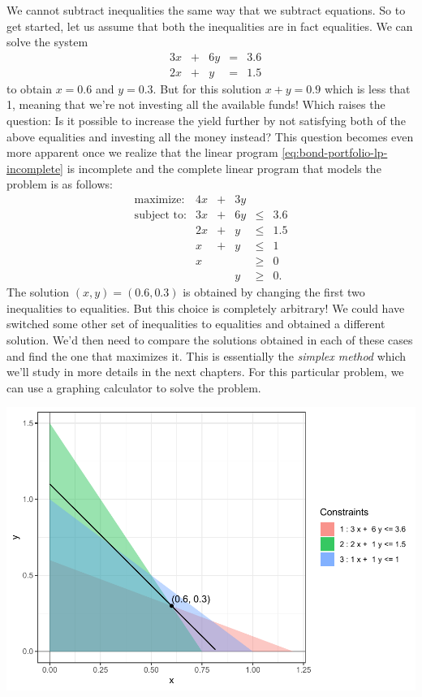 \documentclass[
]{book}
\theoremstyle{definition}
\theoremstyle{definition}
\theoremstyle{definition}
\theoremstyle{definition}
\theoremstyle{remark}
\begin{document}
We cannot subtract inequalities the same way that we subtract equations. So to get started, let us assume that both the inequalities are in fact equalities. We can solve the system
\begin{equation*}
  \begin{array}{rrrrrl}
    & 3x & + & 6y & = & 3.6 \\
    & 2x & + & y & = & 1.5
  \end{array}
\end{equation*}
to obtain \(x = 0.6\) and \(y = 0.3\). But for this solution \(x + y = 0.9\) which is less that 1, meaning that we're not investing all the available funds! Which raises the question: Is it possible to increase the yield further by not satisfying both of the above equalities and investing all the money instead? This question becomes even more apparent once we realize that the linear program \eqref{eq:bond-portfolio-lp-incomplete} is incomplete and the complete linear program that models the problem is as follows:
\begin{equation}
  \begin{array}{rrrrrl}
  \mbox{maximize:} & 4x & + & 3y \\
  \mbox{subject to:}
    & 3x & + & 6y & \le & 3.6 \\
    & 2x & + & y & \le & 1.5 \\
    & x & + & y & \le & 1 \\
    & x &  &  & \ge & 0 \\
    &   &  & y & \ge & 0.
  \end{array}
  \label{eq:bond-portfolio-lp}
\end{equation}
The solution \((x, y) = (0.6, 0.3)\) is obtained by changing the first two inequalities to equalities. But this choice is completely arbitrary! We could have switched some other set of inequalities to equalities and obtained a different solution. We'd then need to compare the solutions obtained in each of these cases and find the one that maximizes it. This is essentially the \emph{simplex method} which we'll study in more details in the next chapters. For this particular problem, we can use a graphing calculator to solve the problem.

\includegraphics{Introduction-to-Optimization_files/figure-latex/fig-bond-portfolio-1.pdf}
\end{document}
